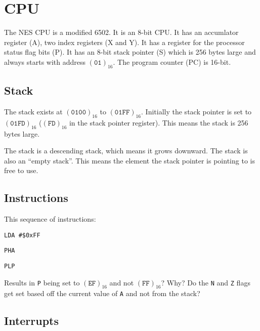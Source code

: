 \chapter{CPU}

The NES CPU is a modified 6502. It is an 8-bit CPU. It has an accumlator
register (A), two index registers (X and Y). It has a register for the
processor status flag bits (P). It has an 8-bit stack pointer (S) which is
256 bytes large and always starts with address $(\texttt{01})_{16}$. The
program counter (PC) is 16-bit.

\section{Stack}

The stack exists at $(\texttt{0100})_{16}$ to $(\texttt{01FF})_{16}$.
Initially the stack pointer is set to $(\texttt{01FD})_{16}$
($(\texttt{FD})_{16}$ in the stack pointer register). This means the stack is
256 bytes large.

The stack is a descending stack, which means it grows downward. The stack is
also an ``empty stack''. This means the element the stack pointer is pointing
to is free to use.


\section{Instructions}

This sequence of instructions:

\texttt{LDA \#\$0xFF}

\texttt{PHA}

\texttt{PLP}

\noindent Results in \texttt{P} being set to $(\texttt{EF})_{16}$ and not
$(\texttt{FF})_{16}$? Why? Do the \texttt{N} and \texttt{Z} flags get set
based off the current value of \texttt{A} and not from the stack?

\section{Interrupts}
